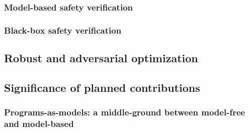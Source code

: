 

\subsubsection{Model-based safety verification}





\subsubsection{Black-box safety verification}






\subsection{Robust and adversarial optimization}




\subsection{Significance of planned contributions}


\subsubsection{Programs-as-models: a middle-ground between model-free and model-based}


